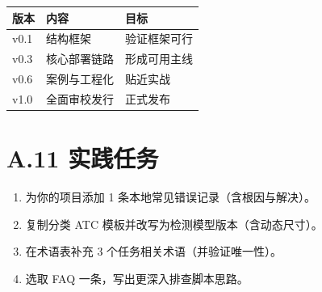 { %
\begin{longtable}[]{@{}lll@{}}
\toprule\noalign{}
版本 & 内容 & 目标 \\
\midrule\noalign{}
\endhead
\bottomrule\noalign{}
\endlastfoot
v0.1 & 结构框架 & 验证框架可行 \\
v0.3 & 核心部署链路 & 形成可用主线 \\
v0.6 & 案例与工程化 & 贴近实战 \\
v1.0 & 全面审校发行 & 正式发布 \\
\end{longtable}
}

\section{A.11 实践任务}\label{src-book-appendix-h14}

\begin{enumerate}
\def\labelenumi{\arabic{enumi}.}
\tightlist
\item
  为你的项目添加 1 条本地常见错误记录（含根因与解决）。
\item
  复制分类 ATC 模板并改写为检测模型版本（含动态尺寸）。
\item
  在术语表补充 3 个任务相关术语（并验证唯一性）。
\item
  选取 FAQ 一条，写出更深入排查脚本思路。
\end{enumerate}
